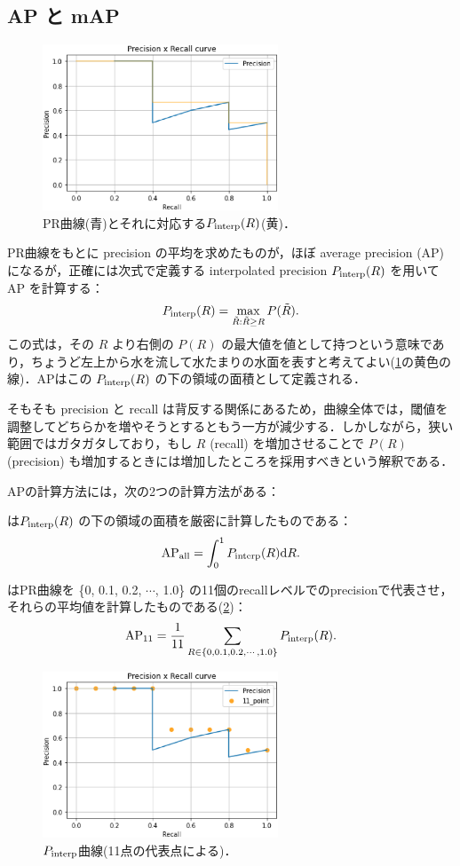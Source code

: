 \documentclass[originalpaper,fleqn]{jsaiart}     %
\begin{document}
\subsection{AP と mAP}
\begin{figure}
    \centering
    \includegraphics[width=7cm,clip]{fig/PR_interp.eps}
    \caption{ PR曲線(青)とそれに対応する$P_{\rm interp}(R)$(黄)．}
    \label{fig:PRinterp}
\end{figure}
PR曲線をもとに precision の平均を求めたものが，ほぼ average precision (AP) になるが，正確には次式で定義する  interpolated precision $P_{\rm interp}(R)$ を用いて AP を計算する：
$$ P_{\rm interp}(R) = \max_{\tilde{R}:\tilde{R}{\geq}R} P(\tilde{R}). $$
この式は，その $R$ より右側の $P(R)$ の最大値を値として持つという意味であり，ちょうど左上から水を流して水たまりの水面を表すと考えてよい(\ref{fig:PRinterp}の黄色の線)．APはこの $P_{\rm interp}(R)$ の下の領域の面積として定義される．

そもそも precision と recall は背反する関係にあるため，曲線全体では，閾値を調整してどちらかを増やそうとするともう一方が減少する．しかしながら，狭い範囲ではガタガタしており，もし $R$ (recall) を増加させることで $P(R)$ (precision) も増加するときには増加したところを採用すべきという解釈である\cite{MRS09}．

APの計算方法には，次の2つの計算方法がある：

は$P_{\rm interp}(R)$ の下の領域の面積を厳密に計算したものである：
$$ \mbox{AP}_{\rm all} = \int_0^1 P_{\rm interp}(R) {\rm d}R. $$

はPR曲線を \{0, 0.1, 0.2, $\cdots$, 1.0\} の11個のrecallレベルでのprecisionで代表させ，それらの平均値を計算したものである(\ref{fig:PR11})：
$$ \mbox{AP}_{11} = \frac{1}{11} \sum_{R\in\{0, 0.1, 0.2, \cdots, 1.0\}} P_{\rm interp}(R). $$
\begin{figure}
    \centering
    \includegraphics[width=7cm,clip]{fig/PR_11.eps}
    \caption{ $P_{\rm interp}$曲線(11点の代表点による)．}
    \label{fig:PR11}
\end{figure}
\end{document}

